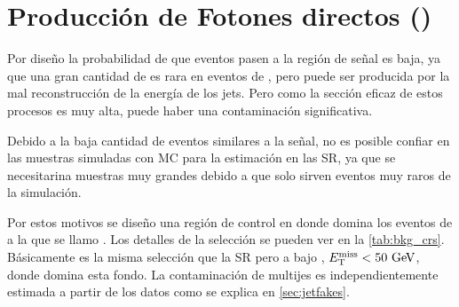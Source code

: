 




\section{Producción de Fotones directos (\gjet)}

Por diseño la probabilidad de que eventos {\gjet} pasen a la región de señal es baja,
ya que una gran cantidad de {\met} es rara en eventos de {\gjet}, pero puede ser
producida por la mal reconstrucción de la energía de los jets. Pero como la
sección eficaz de estos procesos es muy alta, puede haber una contaminación
significativa.

Debido a la baja cantidad de eventos similares a la señal, no es posible confiar
en las muestras simuladas con MC para la estimación en las SR, ya que se necesitarina
muestras muy grandes debido a que solo sirven eventos muy raros de la simulación.

Por estos motivos se diseño una región de control en donde domina los eventos
de {\gjet} a la que se llamo {\CRQ}. Los detalles de la selección se pueden ver
en la \cref{tab:bkg_crs}. Básicamente es la misma selección que la SR pero a bajo {\met},
$\met < 50 \gev$, donde domina esta fondo. La contaminación de multijes es independientemente estimada
a partir de los datos como se explica en \cref{sec:jetfakes}.

